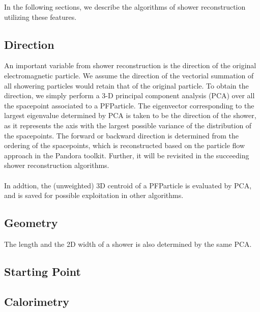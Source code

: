 In the following sections, we describe the algorithms of shower reconstruction 
utilizing these features.

\subsection{Direction}

An important variable from shower reconstruction is the direction of the 
original electromagnetic particle.
We assume the direction of the vectorial summation of all showering particles 
would retain that of the original particle.
To obtain the direction,
we simply perform a 3-D principal component 
analysis (PCA) over all the spacepoint associated to a PFParticle.
The eigenvector corresponding to the largest eigenvalue determined by
PCA is taken to be the direction of the shower, as it represents the axis
with the largest possible variance of the distribution of the spacepoints.
The forward or backward direction is determined from the ordering of
the spacepoints, which is reconstructed based on the particle flow approach in
the Pandora toolkit.
Further, it will be revisited in the succeeding
shower reconstruction algorithms.\\
\\
In addtion, the (unweighted) 3D centroid of a PFParticle is evaluated
by PCA, and is saved for possible exploitation in other algorithms.

\subsection{Geometry}

The length and the 2D width of a shower is also determined by the same PCA. 


\subsection{Starting Point}

\subsection{Calorimetry}

